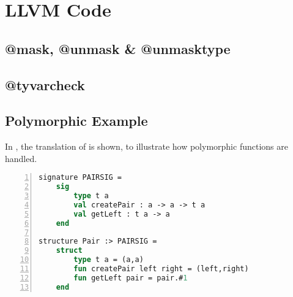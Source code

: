 \chapter{LLVM Code}
\label{app:LLVMCode}
\section{@mask, @unmask \& @unmasktype}

\section{@tyvarcheck}

\section{Polymorphic Example}
\label{sec:PolymorphicExample}

In , the \LLVMIR translation of  is shown, to illustrate how polymorphic functions are handled.

\begin{lstlisting}[frame=single, language=ML,numbers=left, label=ml:polymorphic, caption={[Pair structure MiniML]The polymorphic Pair structure.}]
signature PAIRSIG =
    sig 
        type t a
        val createPair : a -> a -> t a
        val getLeft : t a -> a
    end

structure Pair :> PAIRSIG =
    struct
        type t a = (a,a)
        fun createPair left right = (left,right)
        fun getLeft pair = pair.#1
    end
\end{lstlisting}


